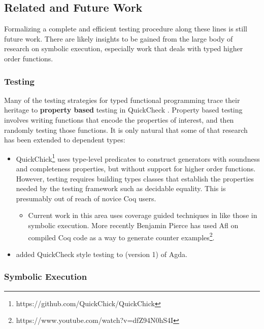 \subsection{Related and Future Work}
 
Formalizing a complete and efficient testing procedure along these lines is still future work.
There are likely insights to be gained from the large body of research on symbolic execution, especially work that deals with typed higher order functions.
 
\subsubsection{Testing}
 
Many of the testing strategies for typed functional programming trace their heritage to \textbf{property based} testing in QuickCheck \cite{quickcheck}.
Property based testing involves writing functions that encode the properties of interest, and then randomly testing those functions.
It is only natural that some of that research has been extended to dependent types:
\begin{itemize}
\item
QuickChick\footnote{https://github.com/QuickChick/QuickChick} \cite{denes2014quickchick}\cite{lampropoulos2017generating,lampropoulos2017beginner,lampropoulos2018random}
 uses type-level predicates to construct generators with soundness and completeness properties, but without support for higher order functions.
However, testing requires building types classes that establish the properties needed by the testing framework such as decidable equality.
This is presumably out of reach of novice Coq users.
\begin{itemize}
\item
Current work in this area uses coverage guided techniques in \cite{lampropoulos2019coverage} like those in symbolic execution.
More recently Benjamin Pierce has used Afl on compiled Coq code as a way to generate counter examples\footnote{https://www.youtube.com/watch?v=dfZ94N0hS4I}.
\end{itemize}
\item \cite{dybjer2003combining} added QuickCheck style testing to (version 1) of Agda.
\end{itemize}
 
\subsubsection{Symbolic Execution}
 
